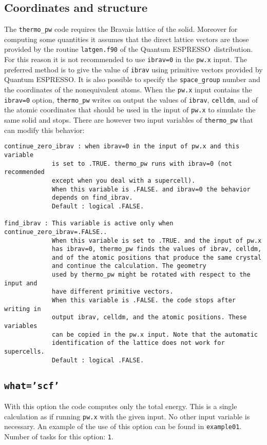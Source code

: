 \documentclass[12pt,a4paper]{article}
\def\qe{{\sc Quantum ESPRESSO}}
\begin{document}
\subsection{\color{web-blue}Coordinates and structure}
The \texttt{thermo\_pw} code requires the Bravais lattice of the solid. 
Moreover for computing some quantities it assumes that the direct lattice 
vectors are those provided by the routine \texttt{latgen.f90} of the \qe\ 
distribution. 
For this reason it is not recommended to use \texttt{ibrav=0} in the
\texttt{pw.x} input. The preferred method is to give the value of 
\texttt{ibrav} using primitive vectors provided by \qe.
It is also possible to specify the \texttt{space\_group} number and 
the coordinates of the nonequivalent atoms. When the 
\texttt{pw.x} input contains the \texttt{ibrav=0} option, 
\texttt{thermo\_pw} writes on output
the values of \texttt{ibrav}, \texttt{celldm}, and of the atomic coordinates
that should be used in the input of \texttt{pw.x} to simulate the same 
solid and stops. There are however two input variables of \texttt{thermo\_pw} 
that can modify this behavior:
\begin{verbatim}
continue_zero_ibrav : when ibrav=0 in the input of pw.x and this variable 
             is set to .TRUE. thermo_pw runs with ibrav=0 (not recommended
             except when you deal with a supercell). 
             When this variable is .FALSE. and ibrav=0 the behavior 
             depends on find_ibrav.
             Default : logical .FALSE.

find_ibrav : This variable is active only when continue_zero_ibrav=.FALSE..
             When this variable is set to .TRUE. and the input of pw.x
             has ibrav=0, thermo_pw finds the values of ibrav, celldm,
             and of the atomic positions that produce the same crystal 
             and continue the calculation. The geometry 
             used by thermo_pw might be rotated with respect to the input and
             have different primitive vectors.
             When this variable is .FALSE. the code stops after writing in
             output ibrav, celldm, and the atomic positions. These variables 
             can be copied in the pw.x input. Note that the automatic 
             identification of the lattice does not work for supercells.
             Default : logical .FALSE.
\end{verbatim}

\subsection{\color{web-blue}\texttt{what='scf'}}
With this option the code computes only the total energy. This is a single
calculation as if running \texttt{pw.x} with the given input.
No other input variable is necessary.
An example of the use of this option can be found in \texttt{example01}. \\
Number of tasks for this option: \texttt{1}.
\end{document}
